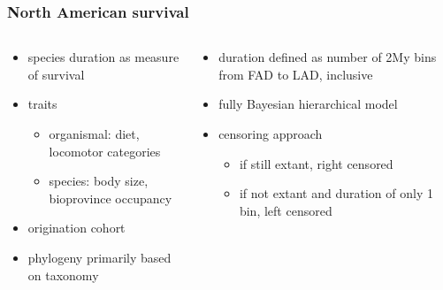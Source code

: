 \documentclass{beamer}
\begin{document}
\begin{frame}
  \frametitle{North American survival}
  \begin{columns}
    \begin{column}{0.5\textwidth}
      \begin{itemize}
        \item species duration as measure of survival
        \item traits
          \begin{itemize}
            \item organismal: diet, locomotor categories
            \item species: body size, bioprovince occupancy
          \end{itemize}
        \item origination cohort
        \item phylogeny primarily based on taxonomy
      \end{itemize}
    \end{column}
    \begin{column}{0.5\textwidth}
      \begin{itemize}
        \item duration defined as number of 2My bins from FAD to LAD, inclusive
        \item fully Bayesian hierarchical model
        \item censoring approach
          \begin{itemize}
            \item if still extant, right censored
            \item if not extant and duration of only 1 bin, left censored
          \end{itemize}
      \end{itemize}
    \end{column}
  \end{columns}
\end{frame}
\end{document}

